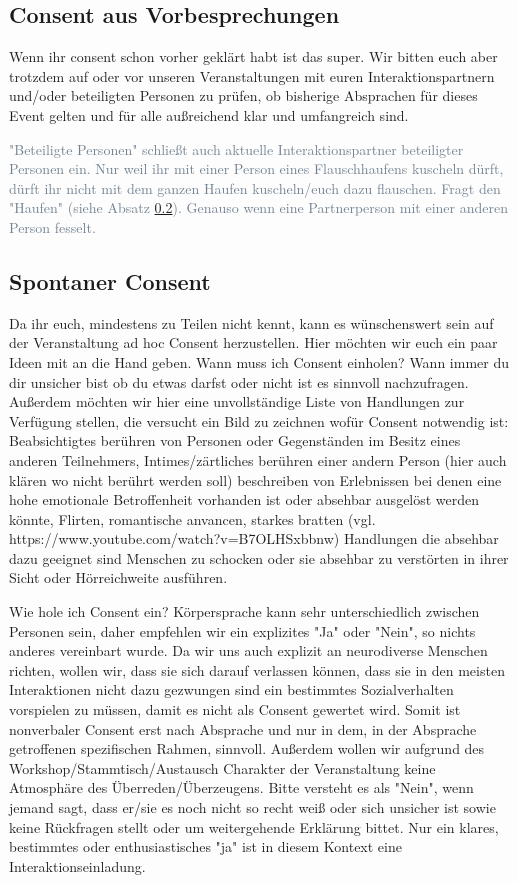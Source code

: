 \documentclass{article}
\begin{document}
\subsection{Consent aus Vorbesprechungen}
Wenn ihr consent schon vorher geklärt habt ist das super. Wir bitten euch aber trotzdem auf oder vor unseren Veranstaltungen mit euren Interaktionspartnern und/oder beteiligten Personen zu prüfen, ob bisherige Absprachen für dieses Event gelten und für alle außreichend klar und umfangreich sind. 

\begingroup{}
\textcolor{SlateGrey}{"Beteiligte Personen" schließt auch aktuelle Interaktionspartner beteiligter Personen ein. Nur weil ihr mit einer Person eines Flauschhaufens kuscheln dürft, dürft ihr nicht mit dem ganzen Haufen kuscheln/euch dazu flauschen. Fragt den "Haufen" (siehe Absatz \ref{sponcon}). Genauso wenn eine Partnerperson mit einer anderen Person fesselt.}

\endgroup

\subsection{Spontaner Consent}
\label{sponcon}
Da ihr euch, mindestens zu Teilen nicht kennt, kann es wünschenswert sein auf der Veranstaltung ad hoc Consent herzustellen. Hier möchten wir euch ein paar Ideen mit an die Hand geben. Wann muss ich Consent einholen? Wann immer du dir unsicher bist ob du etwas darfst oder nicht ist es sinnvoll nachzufragen. Außerdem möchten wir hier eine unvollständige Liste von Handlungen zur Verfügung stellen, die versucht ein Bild zu zeichnen wofür Consent notwendig ist:
Beabsichtigtes berühren von Personen oder Gegenständen im Besitz eines anderen Teilnehmers, Intimes/zärtliches berühren einer andern Person (hier auch klären wo nicht berührt werden soll) beschreiben von Erlebnissen bei denen eine hohe emotionale Betroffenheit vorhanden ist oder absehbar ausgelöst werden könnte, Flirten, romantische anvancen, starkes bratten (vgl. https://www.youtube.com/watch?v=B7OLHSxbbnw) Handlungen die absehbar dazu geeignet sind Menschen zu schocken oder sie absehbar zu verstörten in ihrer Sicht oder Hörreichweite ausführen.


Wie hole ich Consent ein? Körpersprache kann sehr unterschiedlich zwischen Personen sein, daher empfehlen wir ein explizites "Ja" oder "Nein", so nichts anderes vereinbart wurde. Da wir uns auch explizit an neurodiverse Menschen richten, wollen wir, dass sie sich darauf verlassen können, dass sie in den meisten Interaktionen nicht dazu gezwungen sind ein bestimmtes Sozialverhalten vorspielen zu müssen, damit es nicht als Consent gewertet wird. Somit ist nonverbaler Consent erst nach Absprache und nur in dem, in der Absprache getroffenen spezifischen Rahmen, sinnvoll. Außerdem wollen wir aufgrund des Workshop/Stammtisch/Austausch Charakter der Veranstaltung keine Atmosphäre des Überreden/Überzeugens. Bitte versteht es als "Nein", wenn jemand sagt, dass er/sie es noch nicht so recht weiß oder sich unsicher ist sowie keine Rückfragen stellt oder um weitergehende Erklärung bittet. Nur ein klares, bestimmtes oder enthusiastisches "ja" ist in diesem Kontext eine Interaktionseinladung.
\end{document}
